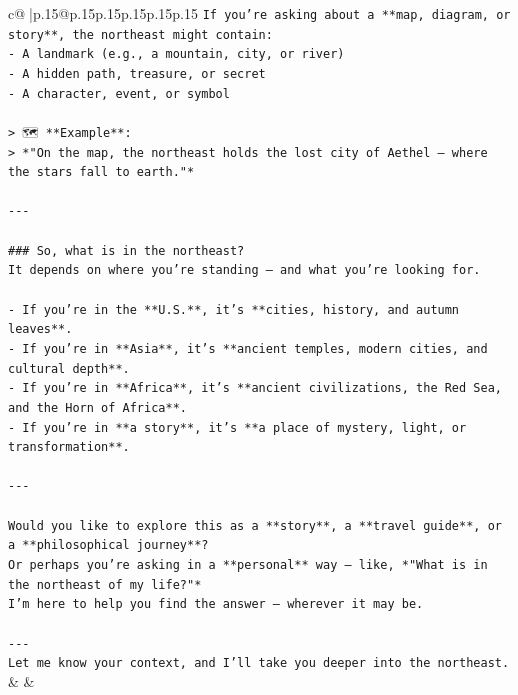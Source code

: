 \documentclass{article}
\begin{document}
{\begin{supertabular}{c@{$\;$}|p{.15\linewidth}@{}p{.15\linewidth}p{.15\linewidth}p{.15\linewidth}p{.15\linewidth}p{.15\linewidth}}
{{{\texttt{If you're asking about a **map, diagram, or story**, the northeast might contain:} \\
\texttt{{-} A landmark (e.g., a mountain, city, or river)  } \\
\texttt{{-} A hidden path, treasure, or secret  } \\
\texttt{{-} A character, event, or symbol} \\
\\ 
\texttt{> 🗺️ **Example**:  } \\
\texttt{> *"On the map, the northeast holds the lost city of Aethel — where the stars fall to earth."*} \\
\\ 
\texttt{{-}{-}{-}} \\
\\ 
\texttt{\#\#\# So, what is in the northeast?  } \\
\texttt{It depends on where you’re standing — and what you’re looking for.} \\
\\ 
\texttt{{-} If you're in the **U.S.**, it’s **cities, history, and autumn leaves**.  } \\
\texttt{{-} If you're in **Asia**, it’s **ancient temples, modern cities, and cultural depth**.  } \\
\texttt{{-} If you're in **Africa**, it’s **ancient civilizations, the Red Sea, and the Horn of Africa**.  } \\
\texttt{{-} If you're in **a story**, it’s **a place of mystery, light, or transformation**.} \\
\\ 
\texttt{{-}{-}{-}} \\
\\ 
\texttt{Would you like to explore this as a **story**, a **travel guide**, or a **philosophical journey**?  } \\
\texttt{Or perhaps you're asking in a **personal** way — like, *"What is in the northeast of my life?"*  } \\
\texttt{I’m here to help you find the answer — wherever it may be.} \\
\\ 
\texttt{{-}{-}{-}  } \\
\texttt{Let me know your context, and I’ll take you deeper into the northeast.} \\
            }
        }
    }
    & & \\ \\


\end{supertabular}}
\end{document}
